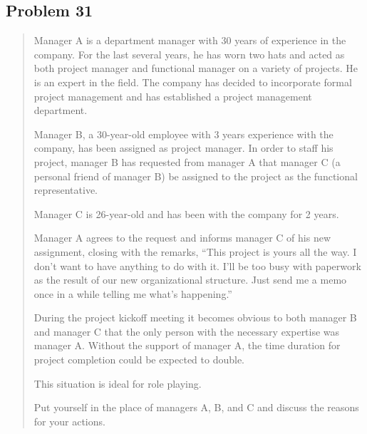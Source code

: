 \documentclass[letterpaper,10pt]{article}
\begin{document}
\subsection*{Problem 31}
\begin{quotation}
Manager A is a department manager with 30 years of experience in the company.  For the last several years, he has worn two hats and acted as both project manager and functional manager on a variety of projects.  He is an expert in the field.  The company has decided to incorporate formal project management and has established a project management department.

Manager B, a 30-year-old employee with 3 years experience with the company, has been assigned as project manager.  In order to staff his project, manager B has requested from manager A that manager C (a personal friend of manager B) be assigned to the project as the functional representative.

Manager C is 26-year-old and has been with the company for 2 years.

Manager A agrees to the request and informs manager C of his new assignment, closing with the remarks, ``This project is yours all the way.  I don't want to have anything to do with it.  I'll be too busy with paperwork as the result of our new organizational structure.  Just send me a memo once in a while telling me what's happening.''

During the project kickoff meeting it becomes obvious to both manager B and manager C that the only person with the necessary expertise was manager A.  Without the support of manager A, the time duration for project completion could be expected to double.

This situation is ideal for role playing.

Put yourself in the place of managers A, B, and C and discuss the reasons for your actions.
\end{quotation}
\end{document}

